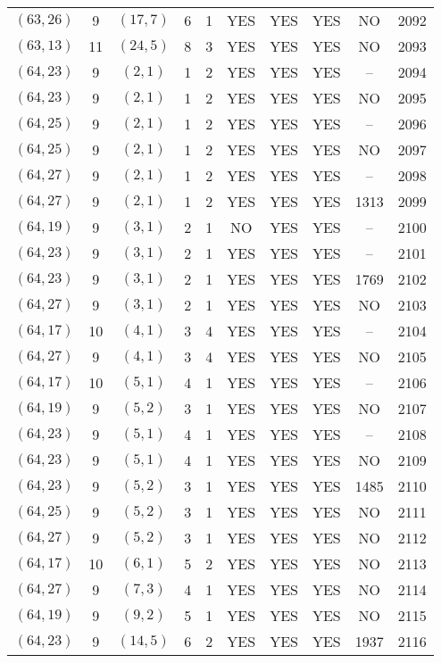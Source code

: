 \begin{longtable}{|c|c|c|c|c|c|c|c|c|c|}
$(63, 26)$ & 9 & $(17, 7)$ & 6 & 1 & YES & YES & YES & NO & 2092\\
$(63, 13)$ & 11 & $(24, 5)$ & 8 & 3 & YES & YES & YES & NO & 2093\\
$(64, 23)$ & 9 & $(2, 1)$ & 1 & 2 & YES & YES & YES & -- & 2094\\
$(64, 23)$ & 9 & $(2, 1)$ & 1 & 2 & YES & YES & YES & NO & 2095\\
$(64, 25)$ & 9 & $(2, 1)$ & 1 & 2 & YES & YES & YES & -- & 2096\\
$(64, 25)$ & 9 & $(2, 1)$ & 1 & 2 & YES & YES & YES & NO & 2097\\
$(64, 27)$ & 9 & $(2, 1)$ & 1 & 2 & YES & YES & YES & -- & 2098\\
$(64, 27)$ & 9 & $(2, 1)$ & 1 & 2 & YES & YES & YES & 1313 & 2099\\
$(64, 19)$ & 9 & $(3, 1)$ & 2 & 1 & NO & YES & YES & -- & 2100\\
$(64, 23)$ & 9 & $(3, 1)$ & 2 & 1 & YES & YES & YES & -- & 2101\\
$(64, 23)$ & 9 & $(3, 1)$ & 2 & 1 & YES & YES & YES & 1769 & 2102\\
$(64, 27)$ & 9 & $(3, 1)$ & 2 & 1 & YES & YES & YES & NO & 2103\\
$(64, 17)$ & 10 & $(4, 1)$ & 3 & 4 & YES & YES & YES & -- & 2104\\
$(64, 27)$ & 9 & $(4, 1)$ & 3 & 4 & YES & YES & YES & NO & 2105\\
$(64, 17)$ & 10 & $(5, 1)$ & 4 & 1 & YES & YES & YES & -- & 2106\\
$(64, 19)$ & 9 & $(5, 2)$ & 3 & 1 & YES & YES & YES & NO & 2107\\
$(64, 23)$ & 9 & $(5, 1)$ & 4 & 1 & YES & YES & YES & -- & 2108\\
$(64, 23)$ & 9 & $(5, 1)$ & 4 & 1 & YES & YES & YES & NO & 2109\\
$(64, 23)$ & 9 & $(5, 2)$ & 3 & 1 & YES & YES & YES & 1485 & 2110\\
$(64, 25)$ & 9 & $(5, 2)$ & 3 & 1 & YES & YES & YES & NO & 2111\\
$(64, 27)$ & 9 & $(5, 2)$ & 3 & 1 & YES & YES & YES & NO & 2112\\
$(64, 17)$ & 10 & $(6, 1)$ & 5 & 2 & YES & YES & YES & NO & 2113\\
$(64, 27)$ & 9 & $(7, 3)$ & 4 & 1 & YES & YES & YES & NO & 2114\\
$(64, 19)$ & 9 & $(9, 2)$ & 5 & 1 & YES & YES & YES & NO & 2115\\
$(64, 23)$ & 9 & $(14, 5)$ & 6 & 2 & YES & YES & YES & 1937 & 2116\\

\end{longtable}
